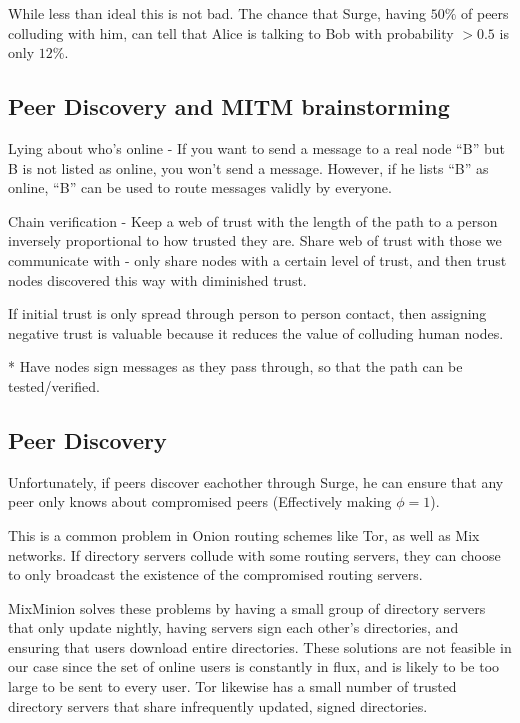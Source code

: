 \documentclass[twocolumn]{paper}
\begin{document}
While less than ideal this is not bad. The chance that Surge, having $50\%$ of peers colluding with him, can tell that Alice is talking to Bob with probability $> 0.5$ is only $12\%$. 

\begin{comment}
  TODO: Apply PIR to obtain security guarantees even when $R \subset S$
\end{comment}

\subsection{Peer Discovery and MITM brainstorming}

Lying about who's online - If you want to send a message to a real node ``B'' but B is not listed as online, you won't send a message. However, if he lists ``B'' as online, ``B'' can be used to route messages validly by everyone. 

Chain verification - Keep a web of trust with the length of the path to a person inversely proportional to how trusted they are. Share web of trust with those we communicate with - only share nodes with a certain level of trust, and then trust nodes discovered this way with diminished trust. 

If initial trust is only spread through person to person contact, then assigning negative trust is valuable because it reduces the value of colluding human nodes. 

* Have nodes sign messages as they pass through, so that the path can be tested/verified. 

\subsection{Peer Discovery}
Unfortunately, if peers discover eachother through Surge, he can ensure that any peer only knows about compromised peers (Effectively making $\phi = 1$).

This is a common problem in Onion routing schemes like Tor, as well as Mix networks. If directory servers collude with some routing servers, they can choose to only broadcast the existence of the compromised routing servers.

MixMinion \cite{minion-design} solves these problems by having a small group of directory servers that only update nightly, having servers sign each other's directories, and ensuring that users download entire directories. These solutions are not feasible in our case since the set of online users is constantly in flux, and is likely to be too large to be sent to every user. Tor \cite{tor-design} likewise has a small number of trusted directory servers that share infrequently updated, signed directories.
\end{document}
